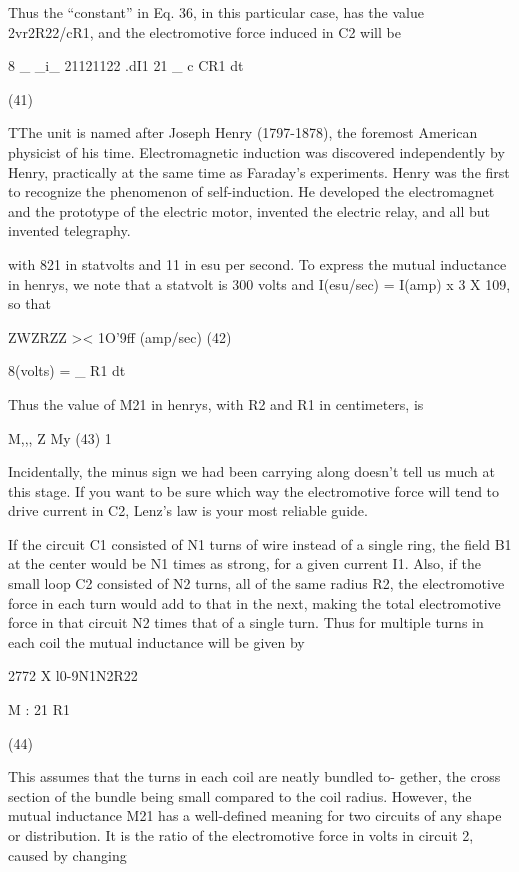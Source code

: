 Thus the ``constant'' in Eq. 36, in this particular case, has the value
2vr2R22/cR1, and the electromotive force induced in C2 will be

8 _ _i_ 21121122 .dI1
21 _ c CR1 dt

(41)

TThe unit is named after Joseph Henry (1797-1878), the foremost American physicist
of his time. Electromagnetic induction was discovered independently by Henry, practically
at the same time as Faraday's experiments. Henry was the first to recognize the
phenomenon of self-induction. He developed the electromagnet and the prototype of
the electric motor, invented the electric relay, and all but invented telegraphy.

 

with 821 in statvolts and 11 in esu per second. To express the mutual
inductance in henrys, we note that a statvolt is 300 volts and
I(esu/sec) = I(amp) x 3 X 109, so that

ZWZRZZ >< 1O'9ff (amp/sec) (42)

8(volts) = _ R1 dt

Thus the value of M21 in henrys, with R2 and R1 in centimeters, is

M,,, Z My (43)
1

Incidentally, the minus sign we had been carrying along doesn't tell
us much at this stage. If you want to be sure which way the electromotive
force will tend to drive current in C2, Lenz's law is your most
reliable guide.

If the circuit C1 consisted of N1 turns of wire instead of a single
ring, the field B1 at the center would be N1 times as strong, for a given
current I1. Also, if the small loop C2 consisted of N2 turns, all of the
same radius R2, the electromotive force in each turn would add to
that in the next, making the total electromotive force in that circuit
N2 times that of a single turn. Thus for multiple turns in each coil
the mutual inductance will be given by

2772 X l0-9N1N2R22

M :
21 R1

(44)

This assumes that the turns in each coil are neatly bundled to-
gether, the cross section of the bundle being small compared to the
coil radius. However, the mutual inductance M21 has a well-defined
meaning for two circuits of any shape or distribution. It is the ratio
of the electromotive force in volts in circuit 2, caused by changing

